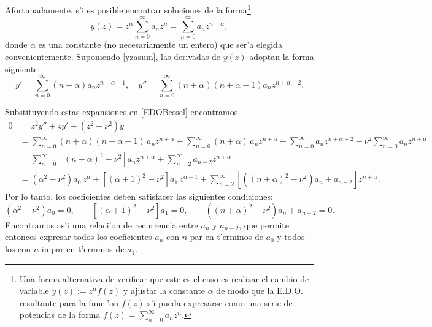 Afortunadamente, s'i es posible encontrar soluciones de la forma\footnote{Una forma alternativa de verificar que este es el caso es realizar el cambio de variable $y(z):=z^\alpha f(z)$ y ajustar la constante $\alpha$ de modo que la E.D.O. resultante para la funci'on $f(z)$ s'i pueda expresarse como una serie de potencias de la forma $f(z) = \sum_{n=0}^\infty a_n z^n$.}
\begin{equation}\label{yzasum}
y(z) = z^\alpha \sum_{n=0}^\infty a_n z^n = \sum_{n=0}^\infty a_n z^{n+\alpha},
\end{equation}
donde $\alpha$ es una constante (no necesariamente un entero) que ser'a elegida convenientemente. Suponiendo \eqref{yzasum}, las derivadas de $y(z)$ adoptan la forma siguiente:
\begin{equation}
y' = \sum_{n=0}^\infty (n+\alpha) a_n z^{n+\alpha-1}, \quad
y'' = \sum_{n=0}^\infty (n+\alpha)(n+\alpha-1) a_n z^{n+\alpha-2}.
\end{equation}

Substituyendo estas expansiones en \eqref{EDOBessel} encontramos
\begin{align}
0 &=  z^2 y'' + z y' + \left( z^2 - \nu^2 \right) y  \\
  &= \sum_{n=0}^\infty (n+\alpha)(n +\alpha - 1)\, a_n z^{n+\alpha}
  + \sum_{n=0}^\infty (n+\alpha)\, a_n z^{n+\alpha} + \sum_{n=0}^\infty a_n z^{n+\alpha+2}
  - \nu^2\sum_{n=0}^\infty a_n z^{n+\alpha}  \\
 &=  \sum_{n=0}^\infty \left[ (n+\alpha)^2 -\nu^2 \right] a_n z^{n+\alpha}
  + \sum_{n=2}^\infty a_{n-2} z^{n+\alpha} \\
 &= (\alpha^2-\nu^2)a_0\,z^\alpha+\left[ (\alpha+1)^2 -\nu^2 \right] a_1\,z^{\alpha+1}
 + \sum_{n=2}^\infty \left[ \left( (n+\alpha)^2 -\nu^2 \right) a_n+a_{n-2}\right]  z^{n+\alpha}.
\end{align}
Por lo tanto, los coeficientes deben satisfacer las siguientes condiciones:
\begin{equation}\label{rrBess}
(\alpha^2-\nu^2)a_0=0,  \qquad \left[ (\alpha+1)^2 -\nu^2 \right] a_1=0, \qquad 
\left( (n+\alpha)^2 -\nu^2 \right) a_n+a_{n-2}=0.
\end{equation}
Encontramos as'i una relaci'on de recurrencia entre $a_n$ y $a_{n-2}$, que permite entonces expresar todos los coeficientes $a_n$ con $n$ par en t'erminos de $a_0$ y todos los con $n$ impar en t'erminos de $a_1$. 

